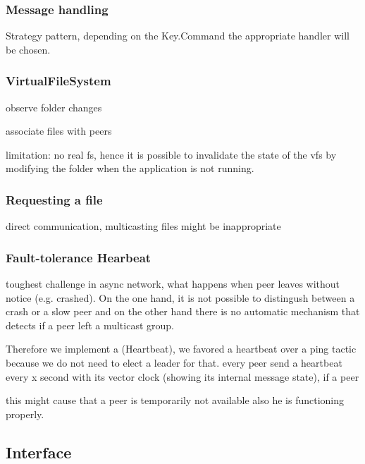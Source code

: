    
    \subsubsection{Message handling}
    Strategy pattern, depending on the Key.Command the appropriate handler will be chosen.
    
    \subsubsection{VirtualFileSystem}
    
    observe folder changes
    
    associate files with peers
    
    limitation: no real fs, hence it is possible to invalidate the state of the vfs by modifying the folder when the application is not running. 
    
    \subsubsection{Requesting a file}
    
    direct communication, multicasting files might be inappropriate
    
    \subsubsection{Fault-tolerance Hearbeat}
    toughest challenge in async network, what happens when peer leaves without notice (e.g. crashed). On the one hand, it is not possible to distingush between a crash or a slow peer and  on the other hand there is no automatic mechanism that detects if a peer left a multicast group.
    
    Therefore we implement a (Heartbeat), we favored a heartbeat over a ping tactic because we do not need to elect a leader for that. 
    every peer send a heartbeat every x second with its vector clock (showing its internal message state), if a peer 
    
    this might cause that a peer is temporarily not available also he is functioning properly.
    

    
    
    

\subsection{Interface}